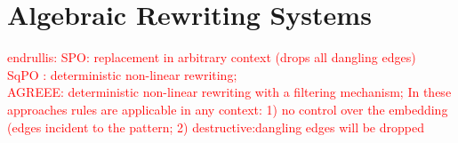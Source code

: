 



\chapter{Algebraic Rewriting Systems} 
    \label{sec:grs}
    \textcolor{red}{endrullis: 
    SPO: replacement in arbitrary context (drops all dangling edges)\\
    SqPO : deterministic non-linear rewriting;\\
    AGREEE: deterministic non-linear rewriting with a filtering mechanism;
    In these approaches rules are applicable in any context: 1) no control over the embedding (edges incident to the pattern; 2) destructive:dangling edges will be dropped
    }
    
